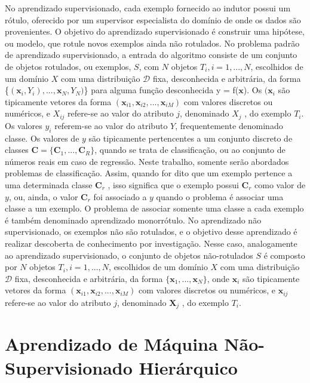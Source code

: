 No aprendizado supervisionado, cada exemplo fornecido ao indutor possui um rótulo, oferecido por um supervisor especialista do domínio de onde os dados são provenientes. O objetivo do aprendizado supervisionado é construir uma hipótese, ou modelo, que rotule novos exemplos ainda não rotulados. No problema padrão de aprendizado supervisionado, a entrada do algoritmo consiste de um conjunto de objetos rotulados, ou exemplos, $S$, com $N$ objetos $T_i, i=1,...,N$, escolhidos de um domínio $X$ com uma distribuição $\mathcal{D}$ fixa, desconhecida e arbitrária, da forma \{$(\mathbf{x}_i,Y_i),..., \mathbf{x}_N,Y_N)$\} para alguma função desconhecida y = f($\mathbf{x}$). Os $(\mathbf{x}_i$ são tipicamente vetores da forma $(\mathbf{x}_{i1},\mathbf{x}_{i2},...,\mathbf{x}_{iM})$ com valores discretos ou numéricos, e $X_{ij}$ refere-se ao valor do atributo $j$, denominado $X_j$ , do exemplo $T_i$. Os valores $y_i$ referem-se ao valor do atributo $Y$, frequentemente denominado classe. Os valores de $y$ são tipicamente pertencentes a um conjunto discreto de classes $\mathbf{C} = \{\mathbf{C}_1,...,\mathbf{C}_R\}$, quando se trata de classificação, ou ao conjunto de números reais em caso de regressão. Neste trabalho, somente serão abordados problemas de classificação. Assim, quando for dito que um exemplo pertence a uma determinada classe $\mathbf{C}_r$ , isso significa que o exemplo possui $\mathbf{C}_r$ como valor de $y$, ou, ainda, o valor $\mathbf{C}_r$ foi associado a $y$ quando o problema é associar uma classe a um exemplo. O problema de associar somente uma classe a cada exemplo é também denominado aprendizado monorrótulo. No aprendizado não supervisionado, os exemplos não são rotulados, e o objetivo desse aprendizado é realizar descoberta de conhecimento por investigação. Nesse caso, analogamente ao aprendizado supervisionado, o conjunto de objetos não-rotulados $S$ é composto por $N$ objetos $T_i, i=1,...,N$, escolhidos de um domínio $X$ com uma distribuição $\mathcal{D}$ fixa, desconhecida e arbitrária, da forma $\{\mathbf{x}_1,...,\mathbf{x}_N\}$, onde $\mathbf{x}_i$ são tipicamente vetores da forma $(\mathbf{x}_{i1},\mathbf{x}_{i2},...,\mathbf{x}_{iM})$ com valores discretos ou numéricos, e $\mathbf{x}_{ij}$ refere-se ao valor do atributo $j$, denominado $\mathbf{X}_j$ , do exemplo $T_i$. 

\section {Aprendizado de Máquina Não-Supervisionado Hierárquico}


